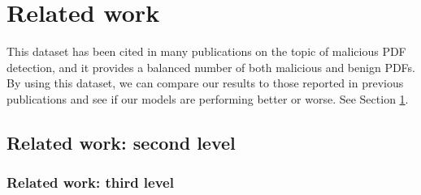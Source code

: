 \documentclass[twocolumn, switch]{article} %
\begin{document}
\section{Related work}
\label{sec:relatedwork}
This dataset has been cited in many publications on the topic of malicious PDF detection, and it provides a balanced number of both malicious and benign PDFs. By using this dataset, we can compare our results to those reported in previous publications and see if our models are performing better or worse.
See Section \ref{sec:relatedwork}.
\subsection{Related work: second level}
\subsubsection{Related work: third level}

\end{document}
